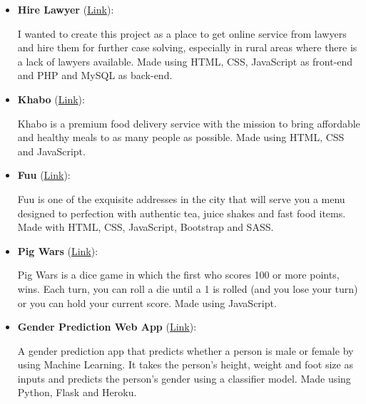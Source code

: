 

\begin{cventries}
\begin{custom1}

\begin{itemize}

\item \textbf{Hire Lawyer} ({\href{http://hire-lawyer.website/}{\color{blue}Link}}):

I wanted to create this project as a place to get online service from lawyers and hire them for further case solving, especially in rural areas where there is a lack of lawyers available. Made using HTML, CSS, JavaScript as front-end and PHP and MySQL as back-end.


\item \textbf{Khabo} ({\href{https://khabo.netlify.app/}{\color{blue}Link}}):

Khabo is a premium food delivery service with the mission to bring affordable and healthy meals to as many people as possible. Made using HTML, CSS and JavaScript.


\item \textbf{Fuu} ({\href{https://fuu.netlify.app/}{\color{blue}Link}}):

Fuu is one of the exquisite addresses in the city that will serve you a menu designed to perfection with authentic tea, juice shakes and fast food items. Made with HTML, CSS, JavaScript, Bootstrap and SASS.


\item \textbf{Pig Wars} ({\href{https://pig-wars.netlify.app/}{\color{blue}Link}}):

Pig Wars is a dice game in which the first who scores 100 or more points, wins. Each turn, you can roll a die until a 1 is rolled (and you lose your turn) or you can hold your current score. Made using JavaScript.


\item \textbf{Gender Prediction Web App} ({\href{https://gender-prediction-app1.herokuapp.com/}{\color{blue}Link}}):


A gender prediction app that predicts whether a person is male or female by using Machine Learning. It takes the person’s height, weight and foot size as inputs and predicts the person’s gender using a classifier model. Made using Python, Flask and Heroku.



\end{itemize}


\end{custom1}
\end{cventries}
